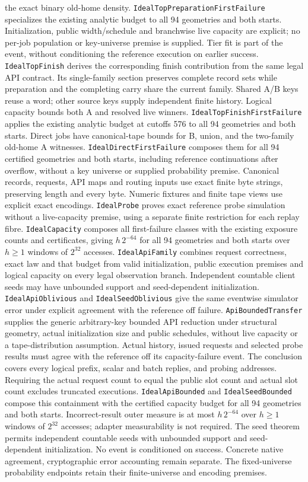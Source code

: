 \documentclass[11pt]{article}
\theoremstyle{definition}
\theoremstyle{remark}
\begin{document}
the exact binary old-home density. \texttt{IdealTopPreparationFirstFailure}
specializes the existing analytic budget to all 94 geometries and both starts.
Initialization, public width/schedule and branchwise live capacity are explicit;
no per-job population or key-universe premise is supplied. Tier fit is part of
the event, without conditioning the reference execution on earlier success.
\texttt{IdealTopFinish} derives the corresponding finish contribution from
the same legal API contract. Its single-family section preserves complete
record sets while preparation and the completing carry share the current
family. Shared A/B keys reuse a word; other source keys supply independent
finite history. Logical capacity bounds both A and resolved live winners.
\texttt{IdealTopFinishFirstFailure} applies the existing analytic budget at
cutoffs 576 to all 94 geometries and both starts.
Direct jobs have canonical-tape bounds for B, union, and the two-family
old-home A witnesses. \texttt{IdealDirectFirstFailure} composes them for all
94 certified geometries and both starts, including reference continuations
after overflow, without a key universe or supplied probability premise.
Canonical records, requests, API maps and routing inputs use exact finite
byte strings, preserving length and every byte. Numeric fixtures and
finite tape views use explicit exact encodings. \texttt{IdealProbe} proves
exact reference probe simulation without a live-capacity premise, using a
separate finite restriction for each replay fibre. \texttt{IdealCapacity}
composes all first-failure classes with the existing exposure counts and
certificates, giving $h\,2^{-64}$ for all 94 geometries and both starts over
$h\geq1$ windows of $2^{32}$ accesses. \texttt{IdealApiFamily} combines
request correctness, exact law and that budget from valid initialization,
public execution premises and logical capacity on every legal observation
branch. Independent countable client seeds may have unbounded support and
seed-dependent initialization. \texttt{IdealApiOblivious} and
\texttt{IdealSeedOblivious} give the same eventwise simulator error under
explicit agreement with the reference off failure.
\texttt{ApiBoundedTransfer} supplies the generic arbitrary-key bounded API
reduction under structural geometry, actual initialization size and public
schedules, without live capacity or a tape-distribution assumption. Actual
history, issued requests and selected probe results must agree with the
reference off its capacity-failure event. The conclusion covers every logical
prefix, scalar and batch replies, and probing addresses. Requiring the actual
request count to equal the public slot count and actual slot count excludes
truncated executions. \texttt{IdealApiBounded} and
\texttt{IdealSeedBounded} compose this containment with the certified capacity
budget for all 94 geometries and both starts. Incorrect-result outer measure
is at most $h\,2^{-64}$ over $h\geq1$ windows of $2^{32}$ accesses; adapter
measurability is not required. The seed theorem permits independent countable
seeds with unbounded support and seed-dependent initialization. No event is
conditioned on success. Concrete native agreement, cryptographic error
accounting remain separate. The fixed-universe probability endpoints
retain their finite-universe and encoding premises.
\end{document}
